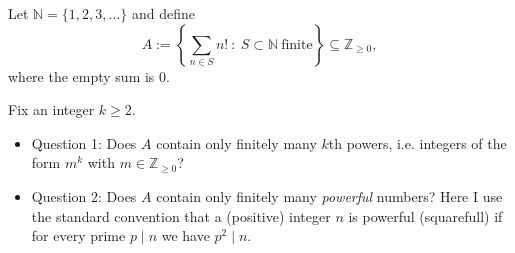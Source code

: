 Let $\mathbb{N}=\{1,2,3,\dots\}$ and define
\[A := \left\{ \sum_{n\in S} n! \ :\  S\subset \mathbb{N}\ \text{finite}\right\} \subseteq \mathbb{Z}_{\ge 0},\]
where the empty sum is $0$.

Fix an integer $k\ge 2$.
\begin{itemize}
\item Question 1: Does $A$ contain only finitely many $k$th powers, i.e. integers of the form $m^k$ with $m\in\mathbb{Z}_{\ge 0}$?
\item Question 2: Does $A$ contain only finitely many \emph{powerful} numbers?
Here I use the standard convention that a (positive) integer $n$ is powerful (squarefull) if for every prime $p\mid n$ we have $p^2\mid n$.
\end{itemize}
